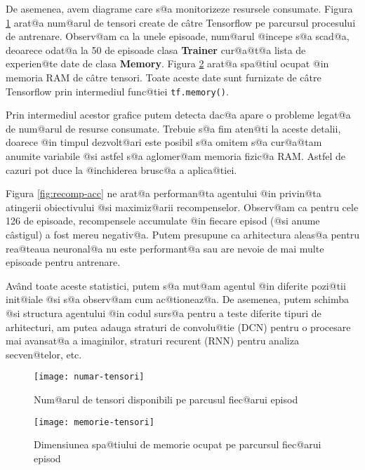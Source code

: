 
De asemenea, avem diagrame care s@a monitorizeze resursele consumate. Figura \ref{fig:numar-tensori} arat@a num@arul de tensori create de c\^ atre Tensorflow pe parcursul procesului de antrenare. Observ@am ca la unele episoade, num@arul @incepe s@a scad@a, deoarece odat@a la 50 de episoade clasa \textbf{Trainer} cur@a@t@a lista de experien@te date de clasa \textbf{Memory}. Figura \ref{fig:memorie-tensori} arat@a spa@tiul ocupat @in memoria RAM de c\^ atre tensori. Toate aceste date sunt furnizate de c\^ atre Tensorflow prin intermediul func@tiei \texttt{tf.memory()}.  

Prin intermediul acestor grafice putem detecta dac@a apare o probleme legat@a de num@arul de resurse consumate. Trebuie s@a fim aten@ti la aceste detalii, doarece @in timpul dezvolt@ari este posibil s@a omitem s@a cur@a@tam anumite variabile @si astfel s@a aglomer@am memoria fizic@a RAM. Astfel de cazuri pot duce la @inchiderea brusc@a a aplica@tiei.

Figura \ref{fig:recomp-acc} ne arat@a performan@ta agentului @in privin@ta atingerii obiectivului @si maximiz@arii recompenselor. Observ@am ca pentru cele 126 de episoade, recompensele accumulate @in fiecare episod (@si anume c\^ astigul) a fost mereu negativ@a. Putem presupune ca arhitectura aleas@a pentru rea@teaua neuronal@a nu este performant@a sau are nevoie de mai multe episoade pentru antrenare.

Av\^and toate aceste statistici, putem s@a mut@am agentul @in diferite pozi@tii init@iale @si s@a observ@am cum ac@tioneaz@a. De asemenea, putem schimba @si structura agentului @in codul surs@a pentru a teste diferite tipuri de arhitecturi, am putea adauga straturi de convolu@tie (DCN) pentru o procesare mai avansat@a a imaginilor, straturi recurent (RNN) pentru analiza secven@telor, etc.



\begin{figure}[h]
	\centering
	\texttt{[image: numar-tensori]}
	\caption{Num@arul de tensori disponibili pe parcusul fiec@arui episod}
	\label{fig:numar-tensori}
\end{figure}


\begin{figure}[h]
	\centering
	\texttt{[image: memorie-tensori]}
	\caption{Dimensiunea spa@tiului de memorie ocupat pe parcursul fiec@arui episod}
	\label{fig:memorie-tensori}
\end{figure}

